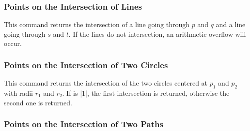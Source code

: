 \subsubsection{Points on the Intersection of Lines}


\begin{command}{\pgfpointintersectionoflines{}}
  This command returns the intersection of a line going through $p$
  and $q$ and a line going through $s$ and $t$. If the lines do not
  intersection, an arithmetic overflow will occur.

\begin{codeexample}[]
\end{codeexample}
\end{command}


\subsubsection{Points on the Intersection of Two Circles}


\begin{command}{\pgfpointintersectionofcircles{}}
  This command returns the intersection of the two circles centered at
  $p_1$ and $p_2$ with radii $r_1$ and $r_2$. If  is
  |1|, the first intersection is returned, otherwise the second one is
  returned.

\begin{codeexample}[]
\end{codeexample}
\end{command}

\subsubsection{Points on the Intersection of Two Paths}


